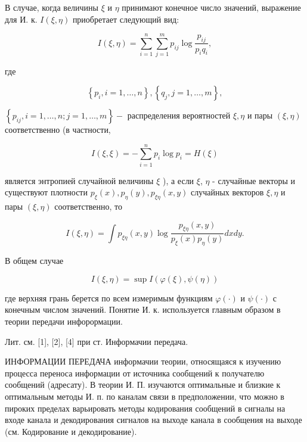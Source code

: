 \documentclass[10pt]{article}
\begin{document}
В случае, когда величины $\xi$ и $\eta$ принимают конечное число значений, выражение для И. к. $I(\xi, \eta)$ приобретает следующий вид:



\[

I(\xi, \eta)=\sum_{i=1}^{n} \sum_{j=1}^{m} p_{i j} \log \frac{p_{i j}}{p_{i} q_{i}},

\]



где



\[

\left\{p_{i}, i=1, \ldots, n\right\},\left\{q_{j}, j=1, \ldots, m\right\},

\]



$\left\{p_{i j}, i=1, \ldots, n ; j=1, \ldots, m\right\}-$ распределения вероятностей $\xi, \eta$ и пары $(\xi, \eta)$ соответственно (в частности,



\[

I(\xi, \xi)=-\sum_{i=1}^{n} p_{i} \log p_{i}=H(\xi)

\]



является энтропией случайной величины $\xi$ ), а если $\xi$, $\eta$ - случайные векторы и существуют плотности $p_{\xi}(x), p_{\eta}(y), p_{\xi \eta}(x, y)$ случайных векторов $\xi, \eta$ и пары $(\xi, \eta)$ соответственно, то



\[

I(\xi, \eta)=\int p_{\xi \eta}(x, y) \log \frac{p_{\xi \eta}(x, y)}{p_{\xi}(x) p_{\eta}(y)} d x d y .

\]



В общем случае



\[

I(\xi, \eta)=\sup I(\varphi(\xi), \psi(\eta))

\]



где верхняя грань берется по всем измеримым функциям $\varphi(\cdot)$ и $\psi(\cdot)$ с конечным числом значений. Понятие И. к. используется главным образом в теории передачи инфорормации.



Лит. см. [1], [2], [4] при ст. Информачии передача.



ИНФОРМАЦИИ ПЕРЕДАЧА информачии теории, относящаяся к изучению процесса переноса информации от источника сообщений к получателю сообщений (адресату). В теории И. П. изучаются оптимальные и близкие к оптимальным методы И. п. по каналам связи в предположении, что можно в пироких пределах варьировать методы кодирования сообщений в сигналы на входе канала и декодирования сигналов на выходе канала в сообщения на выходе (см. Кодирование и декодирование).
\end{document}
